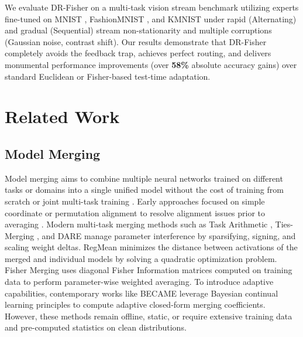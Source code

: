 \documentclass{article}
\theoremstyle{plain}
\theoremstyle{definition}
\theoremstyle{remark}
\begin{document}
We evaluate DR-Fisher on a multi-task vision stream benchmark utilizing experts fine-tuned on MNIST \cite{lecun1998gradient}, FashionMNIST \cite{xiao2017fashion}, and KMNIST \cite{clanuwat2018deep} under rapid (Alternating) and gradual (Sequential) stream non-stationarity and multiple corruptions (Gaussian noise, contrast shift). Our results demonstrate that DR-Fisher completely avoids the feedback trap, achieves perfect routing, and delivers monumental performance improvements (over \textbf{58\%} absolute accuracy gains) over standard Euclidean or Fisher-based test-time adaptation.

\section{Related Work}
\label{submission-related-work}

\subsection{Model Merging}
Model merging aims to combine multiple neural networks trained on different tasks or domains into a single unified model without the cost of training from scratch or joint multi-task training \cite{mcmahan2017communication, ainsworth2022git}. Early approaches focused on simple coordinate or permutation alignment to resolve alignment issues prior to averaging \cite{jordan2022repair, stoica2023zipit}. Modern multi-task merging methods such as Task Arithmetic \cite{ilharco2022editing}, Ties-Merging \cite{yadav2023ties}, and DARE \cite{yu2023dare} manage parameter interference by sparsifying, signing, and scaling weight deltas. RegMean \cite{jin2022regmean} minimizes the distance between activations of the merged and individual models by solving a quadratic optimization problem. Fisher Merging \cite{matena2022merging} uses diagonal Fisher Information matrices computed on training data to perform parameter-wise weighted averaging. To introduce adaptive capabilities, contemporary works like BECAME \cite{li2025became} leverage Bayesian continual learning principles to compute adaptive closed-form merging coefficients. However, these methods remain offline, static, or require extensive training data and pre-computed statistics on clean distributions.
\end{document}
